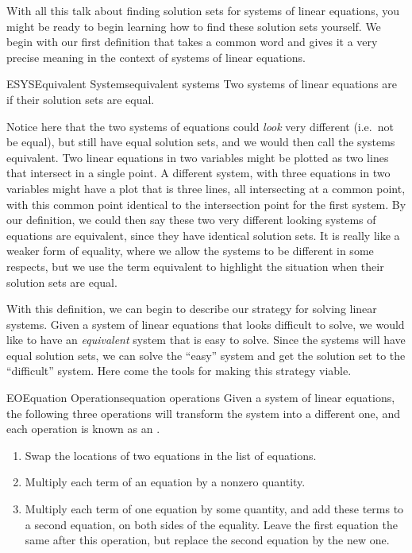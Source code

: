 %
With all this talk about finding solution sets for systems of linear equations, you might be ready to begin learning how to find these solution sets yourself.  We begin with our first definition that takes a common word and gives it a very precise meaning in the context of systems of linear equations.
%
\begin{definition}{ESYS}{Equivalent Systems}{equivalent systems}
Two systems of linear equations are  if their solution sets are equal.
\end{definition}
%
Notice here that the two systems of equations could {\em look} very different (i.e.\ not be equal), but still have equal solution sets, and we would then call the systems equivalent.   Two linear equations in two variables might be plotted as two lines that intersect in a single point.  A different system, with three equations in two variables might have a plot that is three lines, all intersecting at a common point, with this common point identical to the intersection point for the first system.  By our definition, we could then say these two very different looking systems of equations are equivalent, since they have identical solution sets.   It is really like a weaker form of equality, where we allow the systems to be different in some respects, but we use the term equivalent to highlight the situation when their solution sets are equal.\par
%
With this definition, we can begin to describe our strategy for solving linear systems.  Given a system of linear equations that looks difficult to solve, we would like to have an {\em equivalent} system that is easy to solve.  Since the systems will have equal solution sets, we can solve the ``easy'' system and get the solution set to the ``difficult'' system.  Here come the tools for making this strategy viable.\par
%
\begin{definition}{EO}{Equation Operations}{equation operations}
Given a system of linear equations, the following three operations will transform the system into a different one, and each operation is known as an .
%
\begin{enumerate}
\item Swap the locations of two equations in the list of equations.
\item Multiply each term of an equation by a nonzero quantity.
\item Multiply each term of one equation by some quantity, and add these terms to a second equation, on both sides of the equality.  Leave the first equation the same after this operation, but replace the second equation by the new one.
\end{enumerate}
%
\end{definition}
